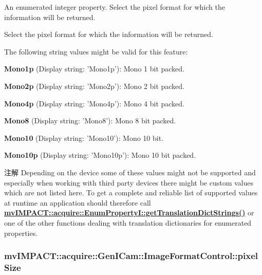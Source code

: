 An enumerated integer property. Select the pixel format for which the information will be returned. 

Select the pixel format for which the information will be returned.

The following string values might be valid for this feature\+:
\begin{DoxyItemize}
\item {\bfseries Mono1p} (Display string\+: 'Mono1p')\+: Mono 1 bit packed.
\item {\bfseries Mono2p} (Display string\+: 'Mono2p')\+: Mono 2 bit packed.
\item {\bfseries Mono4p} (Display string\+: 'Mono4p')\+: Mono 4 bit packed.
\item {\bfseries Mono8} (Display string\+: 'Mono8')\+: Mono 8 bit packed.
\item {\bfseries Mono10} (Display string\+: 'Mono10')\+: Mono 10 bit.
\item {\bfseries Mono10p} (Display string\+: 'Mono10p')\+: Mono 10 bit packed.
\end{DoxyItemize}

\begin{DoxyNote}{注解}
Depending on the device some of these values might not be supported and especially when working with third party devices there might be custom values which are not listed here. To get a complete and reliable list of supported values at runtime an application should therefore call {\bfseries \hyperlink{classmv_i_m_p_a_c_t_1_1acquire_1_1_enum_property_i_a0ba6ccbf5ee69784d5d0b537924d26b6}{mv\+I\+M\+P\+A\+C\+T\+::acquire\+::\+Enum\+Property\+I\+::get\+Translation\+Dict\+Strings()}} or one of the other functions dealing with translation dictionaries for enumerated properties. 
\end{DoxyNote}
\hypertarget{classmv_i_m_p_a_c_t_1_1acquire_1_1_gen_i_cam_1_1_image_format_control_ae53cd02f210eb37fea2b598a5918b92b}{
\subsubsection[{pixel\+Size}]{ mv\+I\+M\+P\+A\+C\+T\+::acquire\+::\+Gen\+I\+Cam\+::\+Image\+Format\+Control\+::pixel\+Size}}\label{classmv_i_m_p_a_c_t_1_1acquire_1_1_gen_i_cam_1_1_image_format_control_ae53cd02f210eb37fea2b598a5918b92b}


